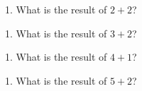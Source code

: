 \documentclass{article}
\begin{document}
1. What is the result of $2+2$?



1. What is the result of $3+2$?



1. What is the result of $4+1$?



1. What is the result of $5+2$?
\end{document}
